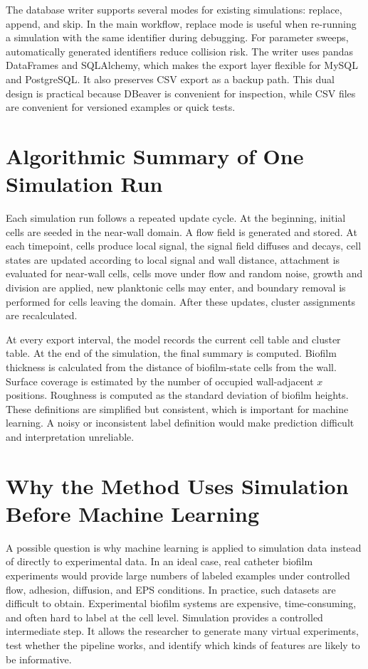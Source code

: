 \documentclass[12pt,a4paper,oneside]{report}
\begin{document}
The database writer supports several modes for existing simulations: replace, append, and skip. In the main workflow, replace mode is useful when re-running a simulation with the same identifier during debugging. For parameter sweeps, automatically generated identifiers reduce collision risk. The writer uses pandas DataFrames and SQLAlchemy, which makes the export layer flexible for MySQL and PostgreSQL. It also preserves CSV export as a backup path. This dual design is practical because DBeaver is convenient for inspection, while CSV files are convenient for versioned examples or quick tests.

\section{Algorithmic Summary of One Simulation Run}
Each simulation run follows a repeated update cycle. At the beginning, initial cells are seeded in the near-wall domain. A flow field is generated and stored. At each timepoint, cells produce local signal, the signal field diffuses and decays, cell states are updated according to local signal and wall distance, attachment is evaluated for near-wall cells, cells move under flow and random noise, growth and division are applied, new planktonic cells may enter, and boundary removal is performed for cells leaving the domain. After these updates, cluster assignments are recalculated.

At every export interval, the model records the current cell table and cluster table. At the end of the simulation, the final summary is computed. Biofilm thickness is calculated from the distance of biofilm-state cells from the wall. Surface coverage is estimated by the number of occupied wall-adjacent \(x\) positions. Roughness is computed as the standard deviation of biofilm heights. These definitions are simplified but consistent, which is important for machine learning. A noisy or inconsistent label definition would make prediction difficult and interpretation unreliable.

\section{Why the Method Uses Simulation Before Machine Learning}
A possible question is why machine learning is applied to simulation data instead of directly to experimental data. In an ideal case, real catheter biofilm experiments would provide large numbers of labeled examples under controlled flow, adhesion, diffusion, and EPS conditions. In practice, such datasets are difficult to obtain. Experimental biofilm systems are expensive, time-consuming, and often hard to label at the cell level. Simulation provides a controlled intermediate step. It allows the researcher to generate many virtual experiments, test whether the pipeline works, and identify which kinds of features are likely to be informative.
\end{document}
